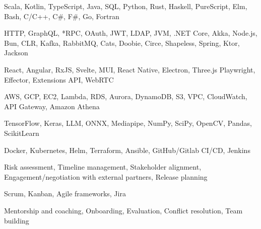 

\begin{cvhonors}

	{Scala, Kotlin, TypeScript, Java, SQL, Python, Rust, Haskell, PureScript, Elm, Bash, C/C++, C\#, F\#, Go, Fortran}
	{}
	{}

	{HTTP, GraphQL, *RPC, OAuth, JWT, LDAP, JVM, .NET Core, Akka, Node.js, Bun, CLR, Kafka, RabbitMQ, Cats, Doobie, Circe, Shapeless, Spring, Ktor, Jackson}
	{}
	{}

	{React, Angular, RxJS, Svelte, MUI, React Native, Electron, Three.js Playwright, Effector, Extensions API, WebRTC}
	{}
	{}

	{AWS, GCP, EC2, Lambda, RDS, Aurora, DynamoDB, S3, VPC, CloudWatch, API Gateway, Amazon Athena}
	{}
	{}

	{TensorFlow, Keras, LLM, ONNX, Mediapipe, NumPy, SciPy, OpenCV, Pandas, ScikitLearn}
	{}
	{}

	{Docker, Kubernetes, Helm, Terraform, Ansible, GitHub/Gitlab CI/CD, Jenkins}
	{}
	{}

\end{cvhonors}


\begin{cvhonors}

	{Risk assessment, Timeline management, Stakeholder alignment, Engagement/negotiation with external partners, Release planning}
	{}
	{}

	{Scrum, Kanban, Agile frameworks, Jira}
	{}
	{}

	{Mentorship and coaching, Onboarding, Evaluation, Conflict resolution, Team building}
	{}
	{}

\end{cvhonors}
